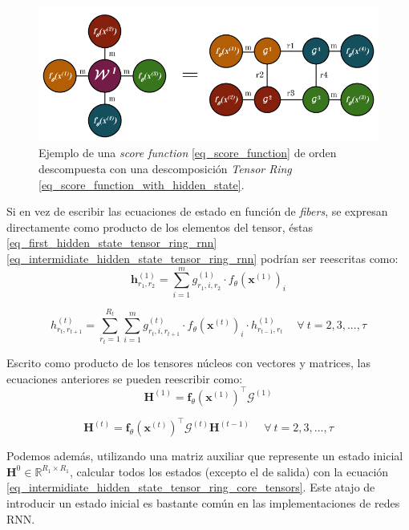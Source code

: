 \documentclass[spanish]{article}
\theoremstyle{definition}
\theoremstyle{remark}
\numberwithin{equation}{section}
\numberwithin{equation}{section} %
\begin{document}
\begin{figure}[H]
 \centering
 \includegraphics[width=12cm]{img/ejemplo_score_function_descomposicion_tensor_ring.png}
\caption[Ejemplo \textit{score function} con una descomposición \textit{Tensor Ring}]{\footnotesize{ Ejemplo de una \textit{score function} \eqref{eq_score_function} de orden descompuesta con una descomposición \textit{Tensor Ring} \eqref{eq_score_function_with_hidden_state}. }}
\label{fig:score_function_tensor_ring}
\end{figure}\par
 Si en vez de escribir las ecuaciones de estado en función de \textit{fibers}, se expresan directamente como producto de los elementos del tensor, éstas \eqref{eq_first_hidden_state_tensor_ring_rnn} \eqref{eq_intermidiate_hidden_state_tensor_ring_rnn} podrían ser reescritas como:
\begin{equation}
\label{eq_first_hidden_state_tensor_ring_core_tensors_element}
\boldsymbol{h}^{(1)}_{r_1,r_2}  
= \sum_{i=1}^m g^{(1)}_{r_1,i,r_2} \cdot f_\theta (\boldsymbol{x}^{(1)})_i
\end{equation} \par
\begin{equation}
\label{eq_intermidiate_hidden_state_tensor_ring_core_tensors_element}
h^{(t)}_{r_{t},r_{t+1}}  
= \sum^{R_{t}}_{r_{t}=1} \sum_{i=1}^m   g^{(t)}_{r_{t},i,r_{t+1}} \cdot f_\theta (\boldsymbol{x}^{(t)})_i \cdot {h}^{(1)}_{r_{t-1},r_t} \ \quad \forall \ t=2,3,...,\tau
\end{equation} \par
Escrito como producto de los tensores núcleos con vectores y matrices, las ecuaciones anteriores se pueden reescribir como:
\begin{equation}
\label{eq_first_hidden_state_tensor_ring_core_tensors}
\boldsymbol{H}^{(1)}=\boldsymbol{f}_\theta(\boldsymbol{x}^{(1)})^\intercal \mathcal{G}^{(1)} 
\end{equation} \par
\begin{equation}
\label{eq_intermidiate_hidden_state_tensor_ring_core_tensors}
\boldsymbol{H}^{(t)}  = \boldsymbol{f}_\theta(\boldsymbol{x}^{(t)})^\intercal \mathcal{G}^{(t)}  \boldsymbol{H}^{(t-1)} \ \quad \forall \ t=2,3,...,\tau
\end{equation} \par
Podemos además, utilizando una matriz auxiliar que represente un estado inicial $\boldsymbol{H}^{0} \in \mathbb{R}^{R_1 \times R_1}$, calcular todos los estados (excepto el de salida) con la ecuación \eqref{eq_intermidiate_hidden_state_tensor_ring_core_tensors}. Este atajo de introducir un estado inicial es bastante común en las implementaciones de redes RNN. \par
\end{document}
